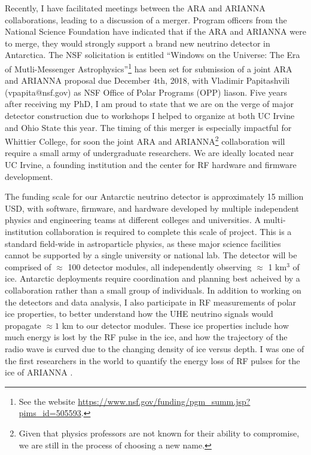\documentclass[../main.tex]{subfiles}
\begin{document}
Recently, I have facilitated meetings between the ARA and ARIANNA collaborations, leading to a discussion of a merger.  Program officers from the National Science Foundation have indicated that if the ARA and ARIANNA were to merge, they would strongly support a brand new neutrino detector in Antarctica.  The NSF solicitation is entitled ``Windows on the Universe: The Era of Mutli-Messenger Astrophysics''\footnote{See the website \url{https://www.nsf.gov/funding/pgm_summ.jsp?pims_id=505593}.} has been set for submission of a joint ARA and ARIANNA proposal due December 4th, 2018, with Vladimir Papitashvili (vpapita@nsf.gov) as NSF Office of Polar Programs (OPP) liason.  Five years after receiving my PhD, I am proud to state that we are on the verge of major detector construction due to workshops I helped to organize at both UC Irvine and Ohio State this year.  The timing of this merger is especially impactful for Whittier College, for soon the joint ARA and ARIANNA\footnote{Given that physics professors are not known for their ability to compromise, we are still in the process of choosing a new name.} collaboration will require a small army of undergraduate researchers. We are ideally located near UC Irvine, a founding institution and the center for RF hardware and firmware development. \\ \hspace{0.1cm}

The funding scale for our Antarctic neutrino detector is approximately 15 million USD, with software, firmware, and hardware developed by multiple independent physics and engineering teams at different colleges and universities.  A multi-institution collaboration is required to complete this scale of project.  This is a standard field-wide in astroparticle physics, as these major science facilities cannot be supported by a single university or national lab.  The detector will be comprised of $\approx$ 100 detector modules, all independently observing $\approx$ 1 km$^3$ of ice.  Antarctic deployments require coordination and planning best acheived by a collaboration rather than a small group of individuals.  In addition to working on the detectors and data analysis, I also participate in RF measurements of polar ice properties, to better understand how the UHE neutrino signals would propagate $\approx 1$ km to our detector modules.  These ice properties include how much energy is lost by the RF pulse in the ice, and how the trajectory of the radio wave is curved due to the changing density of ice versus depth.  I was one of the first researchers in the world to quantify the energy loss of RF pulses for the ice of ARIANNA \cite{hanson2015}. \\ \hspace{0.1cm}
\end{document}

